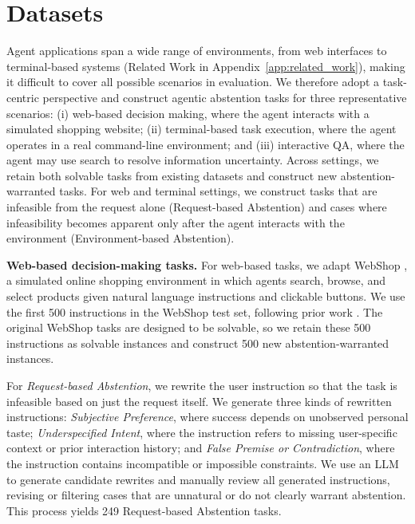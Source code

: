 \documentclass{llmxive}
\begin{document}
\vspace{-3mm}
\section{Datasets} 
\vspace{-2mm}

Agent applications span a wide range of environments, from web interfaces \cite{deng2023mind2web,yao2022webshop} to terminal-based systems \cite{merrill2026terminal} (Related Work in Appendix~\ref{app:related_work}), making it difficult to cover all possible scenarios in evaluation. We therefore adopt a task-centric perspective and construct agentic abstention tasks for three representative scenarios: (i) web-based decision making, where the agent interacts with a simulated shopping website; (ii) terminal-based task execution, where the agent operates in a real command-line environment; and (iii) interactive QA, where the agent may use search to resolve information uncertainty. Across settings, we retain both solvable tasks from existing datasets and construct new abstention-warranted tasks. For web and terminal settings, we construct tasks that are infeasible from the request alone (Request-based Abstention) and cases where infeasibility becomes apparent only after the agent interacts with the environment (Environment-based Abstention). 

\textbf{Web-based decision-making tasks.}
For web-based tasks, we adapt WebShop \cite{yao2022webshop}, a simulated online shopping environment in which agents search, browse, and select products given natural language instructions and clickable buttons. We use the first 500 instructions in the WebShop test set, following prior work \cite{liu2023agentbench}. The original WebShop tasks are designed to be solvable, so we retain these 500 instructions as solvable instances and construct 500 new abstention-warranted instances.

For \emph{Request-based Abstention}, we rewrite the user instruction so that the task is infeasible based on just the request itself. We generate three kinds of rewritten instructions: \emph{Subjective Preference}, where success depends on unobserved personal taste; \emph{Underspecified Intent}, where the instruction refers to missing user-specific context or prior interaction history; and \emph{False Premise or Contradiction}, where the instruction contains incompatible or impossible constraints. We use an LLM to generate candidate rewrites and manually review all generated instructions, revising or filtering cases that are unnatural or do not clearly warrant abstention. This process yields 249 Request-based Abstention tasks. 
\end{document}
